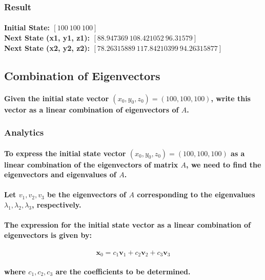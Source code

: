 \subsubsection{Result}
\paragraph{Initial State: $[100\ 100\ 100]$ \\
    Next State (x1, y1, z1): $[ 88.947369\ 108.421052\ 96.31579 ]$ \\
    Next State (x2, y2, z2): $[ 78.26315889\ 117.84210399\ 94.26315877]$}
% 
% 
% 
% 
\subsection{Combination of Eigenvectors}
\paragraph{Given the initial state vector $(x_0, y_0, z_0)=(100, 100, 100)$, write this vector as a linear combination of eigenvectors of $A$.}
\subsubsection{Analytics}
% 
% 
% 
% 
% 
\paragraph{To express the initial state vector \((x_0, y_0, z_0) = (100, 100, 100)\) as a linear combination of the eigenvectors of matrix \(A\), we need to find the eigenvectors and eigenvalues of \(A\).}
% 
\paragraph{Let \(v_1, v_2, v_3\) be the eigenvectors of \(A\) corresponding to the eigenvalues \(\lambda_1, \lambda_2, \lambda_3\), respectively.}
% 
\paragraph{The expression for the initial state vector as a linear combination of eigenvectors is given by:}
% 
\paragraph{\[ \mathbf{x}_0 = c_1 \mathbf{v}_1 + c_2 \mathbf{v}_2 + c_3 \mathbf{v}_3 \]}
% 
\paragraph{where \(c_1, c_2, c_3\) are the coefficients to be determined.}
% 
